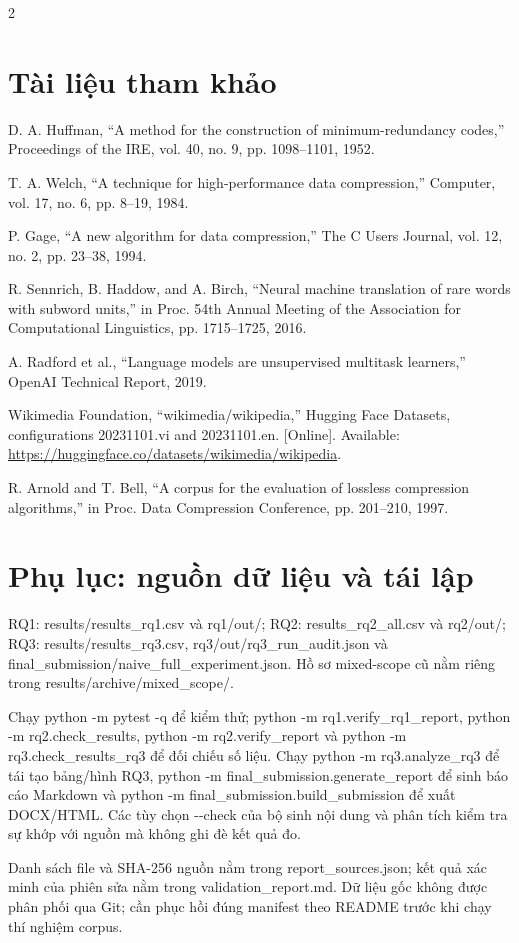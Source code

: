 \documentclass[10pt,letterpaper]{article}
\begin{document}
\begin{multicols}{2}
\section*{Tài liệu tham khảo}
\noindent [1] D. A. Huffman, “A method for the construction of minimum-{}redundancy codes,” Proceedings of the IRE, vol. 40, no. 9, pp. 1098–1101, 1952.\par
\noindent [2] T. A. Welch, “A technique for high-{}performance data compression,” Computer, vol. 17, no. 6, pp. 8–19, 1984.\par
\noindent [3] P. Gage, “A new algorithm for data compression,” The C Users Journal, vol. 12, no. 2, pp. 23–38, 1994.\par
\noindent [4] R. Sennrich, B. Haddow, and A. Birch, “Neural machine translation of rare words with subword units,” in Proc. 54th Annual Meeting of the Association for Computational Linguistics, pp. 1715–1725, 2016.\par
\noindent [5] A. Radford et al., “Language models are unsupervised multitask learners,” OpenAI Technical Report, 2019.\par
\noindent [6] Wikimedia Foundation, “wikimedia/\allowbreak{}wikipedia,” Hugging Face Datasets, configurations 20231101.vi and 20231101.en. [Online]. Available: \url{https://huggingface.co/datasets/wikimedia/wikipedia}.\par
\noindent [7] R. Arnold and T. Bell, “A corpus for the evaluation of lossless compression algorithms,” in Proc. Data Compression Conference, pp. 201–210, 1997.\par
\section*{Phụ lục: nguồn dữ liệu và tái lập}
RQ1: results/\allowbreak{}results\_\allowbreak{}rq1.csv và rq1/\allowbreak{}out/\allowbreak{}; RQ2: results\_\allowbreak{}rq2\_\allowbreak{}all.csv và rq2/\allowbreak{}out/\allowbreak{}; RQ3: results/\allowbreak{}results\_\allowbreak{}rq3.csv, rq3/\allowbreak{}out/\allowbreak{}rq3\_\allowbreak{}run\_\allowbreak{}audit.json và final\_\allowbreak{}submission/\allowbreak{}naive\_\allowbreak{}full\_\allowbreak{}experiment.json. Hồ sơ mixed-{}scope cũ nằm riêng trong results/\allowbreak{}archive/\allowbreak{}mixed\_\allowbreak{}scope/\allowbreak{}.

Chạy python -{}m pytest -{}q để kiểm thử; python -{}m rq1.verify\_\allowbreak{}rq1\_\allowbreak{}report, python -{}m rq2.check\_\allowbreak{}results, python -{}m rq2.verify\_\allowbreak{}report và python -{}m rq3.check\_\allowbreak{}results\_\allowbreak{}rq3 để đối chiếu số liệu. Chạy python -{}m rq3.analyze\_\allowbreak{}rq3 để tái tạo bảng/\allowbreak{}hình RQ3, python -{}m final\_\allowbreak{}submission.generate\_\allowbreak{}report để sinh báo cáo Markdown và python -{}m final\_\allowbreak{}submission.build\_\allowbreak{}submission để xuất DOCX/\allowbreak{}HTML. Các tùy chọn -{}-{}check của bộ sinh nội dung và phân tích kiểm tra sự khớp với nguồn mà không ghi đè kết quả đo.

Danh sách file và SHA-{}256 nguồn nằm trong report\_\allowbreak{}sources.json; kết quả xác minh của phiên sửa nằm trong validation\_\allowbreak{}report.md. Dữ liệu gốc không được phân phối qua Git; cần phục hồi đúng manifest theo README trước khi chạy thí nghiệm corpus.

\end{multicols}
\end{document}
